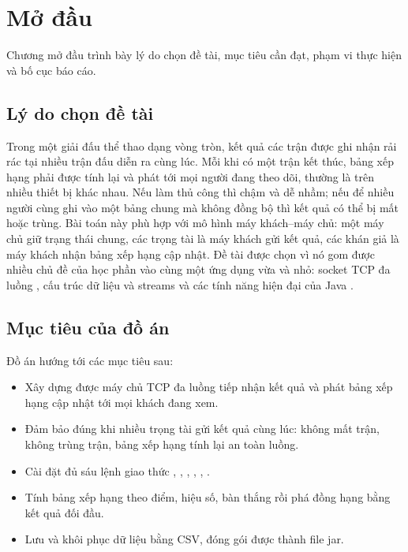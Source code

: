 \chapter{Mở đầu}
\label{ch:modau}

\begin{muctieu}
Chương mở đầu trình bày lý do chọn đề tài, mục tiêu cần đạt, phạm vi thực
hiện và bố cục báo cáo.
\end{muctieu}

\section{Lý do chọn đề tài}

Trong một giải đấu thể thao dạng vòng tròn, kết quả các trận được ghi nhận rải
rác tại nhiều trận đấu diễn ra cùng lúc. Mỗi khi có một trận kết thúc, bảng
xếp hạng phải được tính lại và phát tới mọi người đang theo dõi, thường là trên
nhiều thiết bị khác nhau. Nếu làm thủ công thì chậm và dễ nhầm; nếu để nhiều
người cùng ghi vào một bảng chung mà không đồng bộ thì kết quả có thể bị mất
hoặc trùng. Bài toán này phù hợp với mô hình máy khách--máy chủ: một máy chủ
giữ trạng thái chung, các trọng tài là máy khách gửi kết quả, các khán giả là
máy khách nhận bảng xếp hạng cập nhật. Đề tài được chọn vì nó gom được nhiều
chủ đề của học phần vào cùng một ứng dụng vừa và nhỏ: socket TCP đa luồng
, cấu trúc dữ liệu và streams  và các tính
năng hiện đại của Java .

\section{Mục tiêu của đồ án}

Đồ án hướng tới các mục tiêu sau:
\begin{itemize}[leftmargin=1.6em, itemsep=2pt]
  \item Xây dựng được máy chủ TCP đa luồng tiếp nhận kết quả và phát bảng xếp
        hạng cập nhật tới mọi khách đang xem.
  \item Đảm bảo đúng khi nhiều trọng tài gửi kết quả cùng lúc: không mất trận,
        không trùng trận, bảng xếp hạng tính lại an toàn luồng.
  \item Cài đặt đủ sáu lệnh giao thức , ,
        , , , .
  \item Tính bảng xếp hạng theo điểm, hiệu số, bàn thắng rồi phá đồng hạng bằng
        kết quả đối đầu.
  \item Lưu và khôi phục dữ liệu bằng CSV, đóng gói được thành file jar.
\end{itemize}

